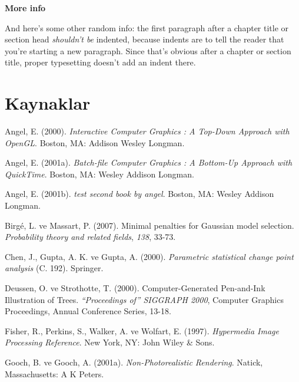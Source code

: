 \documentclass[12pt,twoside]{deuthesis}
\begin{document}
\textbf{More info}

And here's some other random info: the first paragraph after a chapter title or section head \emph{shouldn't be} indented, because indents are to tell the reader that you're starting a new paragraph. Since that's obvious after a chapter or section title, proper typesetting doesn't add an indent there.

\hypertarget{kaynaklar}{%
\chapter*{Kaynaklar}\label{kaynaklar}}


\hypertarget{refs}{}
\begin{CSLReferences}{1}{0}
\leavevmode{}%
Angel, E. (2000). \emph{Interactive Computer Graphics : A Top-Down Approach with OpenGL}. Boston, MA: Addison Wesley Longman.

\leavevmode{}%
Angel, E. (2001a). \emph{Batch-file Computer Graphics : A Bottom-Up Approach with QuickTime}. Boston, MA: Wesley Addison Longman.

\leavevmode{}%
Angel, E. (2001b). \emph{test second book by angel}. Boston, MA: Wesley Addison Longman.

\leavevmode{}%
Birgé, L. ve Massart, P. (2007). Minimal penalties for Gaussian model selection. \emph{Probability theory and related fields}, \emph{138}, 33-73.

\leavevmode{}%
Chen, J., Gupta, A. K. ve Gupta, A. (2000). \emph{Parametric statistical change point analysis} (C. 192). Springer.

\leavevmode{}%
Deussen, O. ve Strothotte, T. (2000). Computer-Generated Pen-and-Ink Illustration of Trees. \emph{{``Proceedings of''} SIGGRAPH 2000}, Computer Graphics Proceedings, Annual Conference Series, 13-18.

\leavevmode{}%
Fisher, R., Perkins, S., Walker, A. ve Wolfart, E. (1997). \emph{Hypermedia Image Processing Reference}. New York, NY: John Wiley \& Sons.

\leavevmode{}%
Gooch, B. ve Gooch, A. (2001a). \emph{{Non-Photorealistic Rendering}}. Natick, Massachusetts: A K Peters.


\end{CSLReferences}
\end{document}
